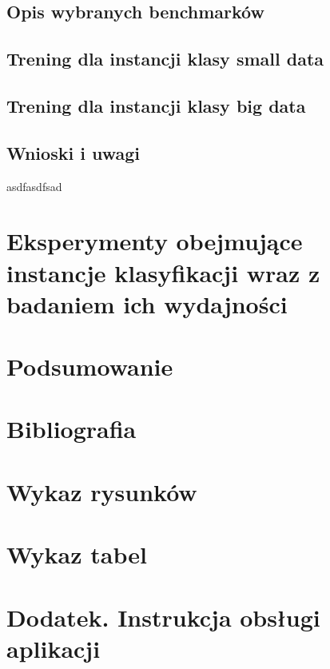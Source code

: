 \documentclass{article}
\begin{document}
\subsection{Opis wybranych benchmarków}
\subsection{Trening dla instancji klasy small data}
\subsection{Trening dla instancji klasy big data}
\subsection{Wnioski i uwagi}
asdfasdfsad
\section{Eksperymenty obejmujące instancje klasyfikacji wraz z badaniem ich wydajności}
\section*{Podsumowanie}
\section*{Bibliografia}
\section*{Wykaz rysunków}
\section*{Wykaz tabel}
\section*{Dodatek. Instrukcja obsługi aplikacji}
\end{document}
